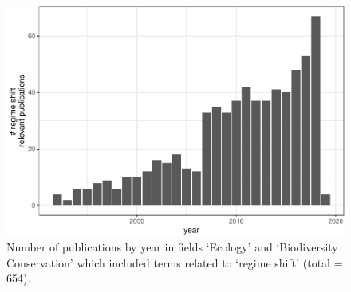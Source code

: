 \documentclass[12pt,twoside,openany]{reedthesis}
\begin{document}
\begin{figure}
\centering
\includegraphics{_myDissertation_files/figure-latex/wosRegimePubsByYear-1.pdf}
\caption{\label{fig:wosRegimePubsByYear}Number of publications by year in
fields `Ecology' and `Biodiversity Conservation' which included terms
related to `regime shift' (total = 654).}
\end{figure}
\end{document}
